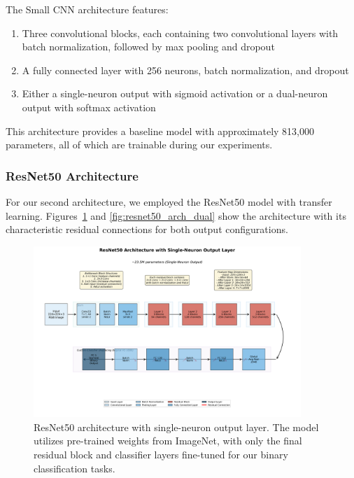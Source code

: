 The Small CNN architecture features:
\begin{enumerate}
\item Three convolutional blocks, each containing two convolutional layers with batch normalization, followed by max pooling and dropout
\item A fully connected layer with 256 neurons, batch normalization, and dropout
\item Either a single-neuron output with sigmoid activation or a dual-neuron output with softmax activation
\end{enumerate}

This architecture provides a baseline model with approximately 813,000 parameters, all of which are trainable during our experiments.

\FloatBarrier
\subsubsection{ResNet50 Architecture}

For our second architecture, we employed the ResNet50 model with transfer learning. Figures~\ref{fig:resnet50_arch_single} and \ref{fig:resnet50_arch_dual} show the architecture with its characteristic residual connections for both output configurations.

\begin{figure}[!htbp]
\centering
\includegraphics[width=0.9\textwidth]{figures/resnet50_1neuron_architecture.png}
\caption{ResNet50 architecture with single-neuron output layer. The model utilizes pre-trained weights from ImageNet, with only the final residual block and classifier layers fine-tuned for our binary classification tasks.}
\label{fig:resnet50_arch_single}
\end{figure}

